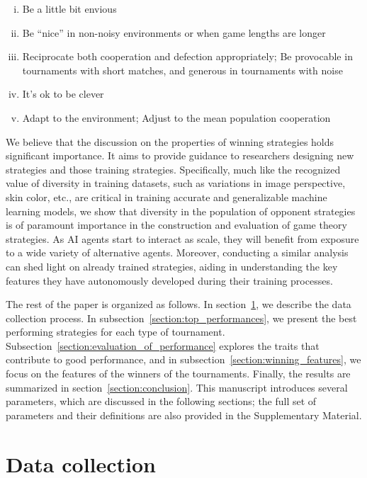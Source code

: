 \documentclass{article}
\begin{document}
\begin{enumerate}[(i)]
    \item Be a little bit envious
    \item Be ``nice'' in non-noisy environments or when game lengths are longer
    \item Reciprocate both cooperation and defection appropriately;
    Be provocable in tournaments with short matches, and generous in tournaments with noise
    \item It's ok to be clever
    \item Adapt to the environment; Adjust to the mean population cooperation
\end{enumerate}

We believe that the discussion on the properties of winning strategies holds
significant importance. It aims to provide guidance to researchers designing new
strategies and those training strategies. Specifically, much like the recognized
value of diversity in training datasets, such as variations in image perspective,
skin color, etc., are critical in training accurate and generalizable machine
learning models, we show that diversity in the population of opponent strategies
is of paramount importance in the construction and evaluation of game theory
strategies. As AI agents start to interact as scale, they will benefit from
exposure to a wide variety of alternative agents. Moreover, conducting a similar
analysis can shed light on already trained strategies, aiding in understanding
the key features they have autonomously developed during their training
processes.

The rest of the paper is organized as follows. In
section~\ref{section:data_collection}, we describe the data collection process.
In subsection~\ref{section:top_performances}, we present the best performing
strategies for each type of tournament.
Subsection~\ref{section:evaluation_of_performance} explores the traits that
contribute to good performance, and in
subsection~\ref{section:winning_features}, we focus on the features of the
winners of the tournaments. Finally, the results are summarized in
section~\ref{section:conclusion}. This manuscript introduces several parameters,
which are discussed in the following sections; the full set of parameters and
their definitions are also provided in the Supplementary Material.

\section{Data collection}\label{section:data_collection}
\end{document}
